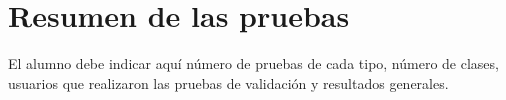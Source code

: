 \section{\forlnameref Resumen de las pruebas}
\label{sec:testsResume}

\begin{shaded}
El alumno debe indicar aquí número de pruebas de cada tipo, número de clases, usuarios que realizaron las pruebas de validación y resultados generales.
\end{shaded}